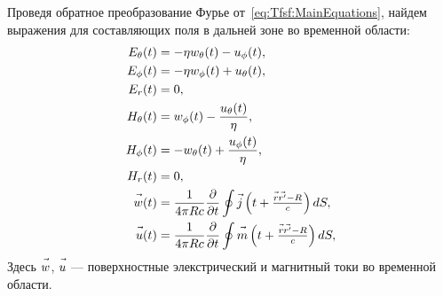 Проведя обратное преобразование Фурье от~\eqref{eq:Tfsf:MainEquations}, найдем
выражения для составляющих поля в дальней зоне во временной области:
\begin{align*}
    E_\theta(t) &= -\eta w_\theta(t) - u_\phi(t), \\
    E_\phi(t)   &= -\eta w_\phi(t) + u_\theta(t), \\
    E_r(t)      &= 0, \\
    H_\theta(t) &= w_\phi(t) - \frac{u_\theta(t)}{\eta}, \\
    H_\phi(t)   &= -w_\theta(t) + \frac{u_\phi(t)}{\eta}, \\
    H_r(t)      &= 0,\\
    \vec{w\mathstrut}(t) &=
        \frac{1}{4\pi Rc} \frac{\partial}{\partial{t}}
        \oint\vec{j\mathstrut}\left(\textstyle t+\frac{\vec{r\mathstrut}\vec{r'\mathstrut}-R}{c}\right)dS,\\
    \vec{u\mathstrut}(t) &=
        \frac{1}{4\pi Rc} \frac{\partial}{\partial{t}}
        \oint\vec{m\mathstrut}\left(\textstyle t+\frac{\vec{r\mathstrut}\vec{r'\mathstrut}-R}{c}\right)dS,
\end{align*}
Здесь $\vec{w\mathstrut}$, $\vec{u\mathstrut}$ --- поверхностные элекстрический и магнитный токи
во временной области.


